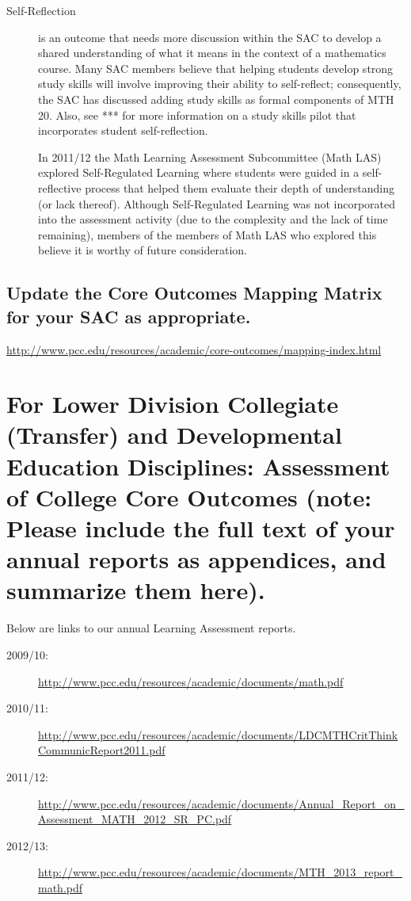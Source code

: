 \begin{description}
\item[Self-Reflection] is an outcome that needs more discussion within the SAC to develop a shared understanding of what it means in the context of a mathematics course.  Many SAC members believe that helping students develop strong study skills will involve improving their ability to self-reflect; consequently, the SAC has discussed adding study skills as formal components of MTH 20.  Also,  see *** for more information on a study skills pilot that incorporates student self-reflection. 

In 2011/12 the Math Learning Assessment Subcommittee (Math LAS) explored Self-Regulated Learning where students were guided in a self-reflective process that helped them evaluate their depth of understanding (or lack thereof).  Although Self-Regulated Learning was not incorporated into the assessment activity (due to the complexity and the lack of time remaining), members of the members of Math LAS who explored this believe it is worthy of future consideration.

\end{description}

\subsection{Update the Core Outcomes Mapping Matrix for your SAC as appropriate.}\url{http://www.pcc.edu/resources/academic/core-outcomes/mapping-index.html} 



\section[Assessment of College Core Outcomes]{For Lower Division Collegiate (Transfer) and Developmental Education Disciplines:  Assessment of College Core Outcomes    (note:  Please include the full text of your annual reports as appendices, and summarize them here).  }

Below are links to our annual Learning Assessment reports. 

\begin{description}
\item[2009/10:] \url{http://www.pcc.edu/resources/academic/documents/math.pdf}
\item[2010/11:] \url{http://www.pcc.edu/resources/academic/documents/LDCMTHCritThinkCommunicReport2011.pdf}
\item[2011/12:] \url{http://www.pcc.edu/resources/academic/documents/Annual_Report_on_Assessment_MATH_2012_SR_PC.pdf}
\item[2012/13:] \url{http://www.pcc.edu/resources/academic/documents/MTH_2013_report_math.pdf}
\end{description}

